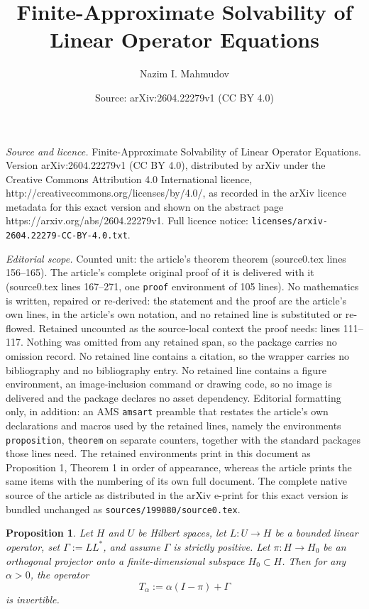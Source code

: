 \documentclass[10pt,a4paper]{amsart}
\title{Finite-Approximate Solvability of Linear Operator Equations}
\author{Nazim I. Mahmudov}
\date{Source: arXiv:2604.22279v1 (CC BY 4.0)}
\newtheorem{proposition}{Proposition}
\begin{document}
\maketitle

\noindent\emph{Source and licence.} Finite-Approximate Solvability of Linear Operator Equations. Version arXiv:2604.22279v1 (CC BY 4.0), distributed by arXiv under the Creative Commons Attribution 4.0 International licence, http://creativecommons.org/licenses/by/4.0/, as recorded in the arXiv licence metadata for this exact version and shown on the abstract page https://arxiv.org/abs/2604.22279v1. Full licence notice: \texttt{licenses/arxiv-2604.22279-CC-BY-4.0.txt}.\par\smallskip

\noindent\textit{Editorial scope.} Counted unit: the article's theorem theorem (source0.tex lines 156--165). The article's complete original proof of it is delivered with it (source0.tex lines 167--271, one \texttt{proof} environment of 105 lines). No mathematics is written, repaired or re-derived: the statement and the proof are the article's own lines, in the article's own notation, and no retained line is substituted or re-flowed.  Retained uncounted as the source-local context the proof needs: lines 111--117.  Nothing was omitted from any retained span, so the package carries no omission record.  No retained line contains a citation, so the wrapper carries no bibliography and no bibliography entry.  No retained line contains a figure environment, an image-inclusion command or drawing code, so no image is delivered and the package declares no asset dependency.  Editorial formatting only, in addition: an AMS \texttt{amsart} preamble that restates the article's own declarations and macros used by the retained lines, namely the environments \texttt{proposition}, \texttt{theorem} on separate counters, together with the standard packages those lines need.  The retained environments print in this document as Proposition 1, Theorem 1 in order of appearance, whereas the article prints the same items with the numbering of its own full document.  The complete native source of the article as distributed in the arXiv e-print for this exact version is bundled unchanged as \texttt{sources/199080/source0.tex}.
	\begin{proposition} \label{prop:1}
		Let \(H\) and \(U\) be Hilbert spaces, let \(L: U \to H\) be a bounded linear operator, set \(\Gamma := L L^*\), and assume \(\Gamma\) is strictly positive. Let \(\pi: H \to H_0\) be an orthogonal projector onto a finite-dimensional subspace \(H_0 \subset H\). Then for any \(\alpha > 0\), the operator
		\[
		T_\alpha := \alpha(I-\pi) + \Gamma
		\]
		is invertible.
	\end{proposition}
\end{document}
